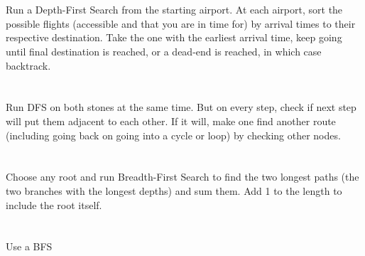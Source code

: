 \documentclass[11pt,letterpaper]{article}
\begin{document}
	\section{}
		Run a Depth-First Search from the starting airport. At each airport, sort the possible flights (accessible and that you are in time for) by arrival times to their respective destination. Take the one with the earliest arrival time, keep going until final destination is reached, or a dead-end is reached, in which case backtrack.
		
	\section{}
		Run DFS on both stones at the same time. But on every step, check if next step will put them adjacent to each other. If it will, make one find another route (including going back on going into a cycle or loop) by checking other nodes.
	
	\section{}
		Choose any root and run Breadth-First Search to find the two longest paths (the two branches with the longest depths) and sum them. Add 1 to the length to include the root itself.
		
	\section{}
		Use a BFS
	
\end{document}
